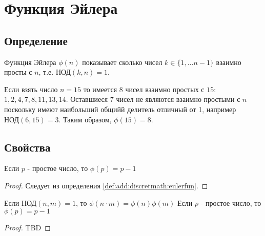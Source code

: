 \section{Функция Эйлера}

\subsection{Определение}
\begin{definition}
Функция Эйлера $\phi\left(n\right)$ показывает сколько чисел $k \in
\{1, ... n-1\}$ взаимно просты с $n$, т.е. $\mbox{НОД}\left(k,
n\right) = 1$.
\label{def:add:discretmath:eulerfun}
\end{definition}

\begin{example}
  Если взять число $n=15$ то имеется 8 чисел взаимно простых с $15$: 
  $1, 2, 4, 7, 8, 11, 13, 14$. Оставшиеся 7 чисел не являются взаимно
  простыми с $n$ поскольку имеют наибольший общийй делитель отличный
  от 1, например $\mbox{НОД}\left(6, 15\right) = 3$.
  Таким образом, $\phi\left(15\right) = 8$. 
\end{example}


\subsection{Свойства}

\begin{property}
Если $p$ - простое число, то $\phi(p) = p - 1$
\begin{proof}
Следует из определения \ref{def:add:discretmath:eulerfun}.
\end{proof}
\label{prop:add:discretmath:eulerfun1}
\end{property}


\begin{property}
Если $\mbox{НОД}\left(n, m\right) = 1$, то
$\phi\left(n \cdot m\right) = \phi\left(n\right) \phi\left( m\right)$
Если $p$ - простое число, то $\phi(p) = p - 1$
\begin{proof}
TBD
\end{proof}
\label{prop:add:discretmath:eulerfun2}
\end{property}
